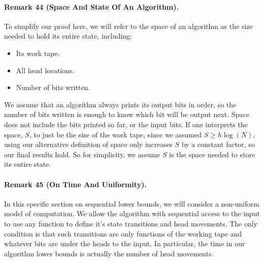 \paragraph{Remark 44 (Space And State Of An Algorithm).} To simplify our proof here, we will refer to the space of an algorithm as the size needed to hold its entire state, including:
\begin{itemize}\item Its work tape.\item All head locations.\item Number of bits written.\end{itemize}
We assume that an algorithm always prints its output bits in order, so the number of bits written is enough to know which bit will be output next. Space does not include the bits printed so far, or the input bits.
If one interprets the space, $S$, to just be the size of the work tape, since we assumed $S\ge h\log(N)$, using our alternative definition of space only increases $S$ by a constant factor, so our final results hold. So for simplicity, we assume $S$ is the space needed to store its entire state.
\paragraph{Remark 45 (On Time And Uniformity).} In this specific section on sequential lower bounds, we will consider a non-uniform model of computation. We allow the algorithm with sequential access to the input to use any function to define it's state transitions and head movements. The only condition is that such transitions are only functions of the working tape and whatever bits are under the heads to the input.
In particular, the time in our algorithm lower bounds is actually the number of head movements.
